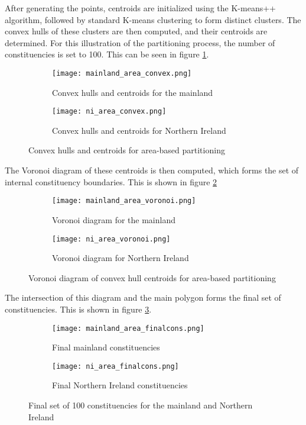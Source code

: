 \documentclass{article}
\begin{document}
After generating the points, centroids are initialized using the K-means++ algorithm, followed by standard K-means clustering to form distinct clusters.
The convex hulls of these clusters are then computed, and their centroids are determined. For this illustration of the partitioning process, the number of constituencies
is set to 100. This can be seen in figure \ref{fig:convexhulls}.

\begin{figure}[H]
    \centering
    \begin{subfigure}{0.48\textwidth}
        \centering
        \texttt{[image: mainland\_area\_convex.png]}
        \caption{Convex hulls and centroids for the mainland}
    \end{subfigure}
    \begin{subfigure}{0.48\textwidth}
        \centering
        \texttt{[image: ni\_area\_convex.png]}
        \caption{Convex hulls and centroids for Northern Ireland}
    \end{subfigure}
    \caption{Convex hulls and centroids for area-based partitioning}
    \label{fig:convexhulls}
\end{figure}


The Voronoi diagram of these centroids is then computed, which forms the set of internal constituency boundaries. This is shown in figure \ref{fig:voronoi}

\begin{figure}[H]
    \centering
    \begin{subfigure}{0.48\textwidth}
        \centering
        \texttt{[image: mainland\_area\_voronoi.png]}
        \caption{Voronoi diagram for the mainland}
    \end{subfigure}
    \begin{subfigure}{0.48\textwidth}
        \centering
        \texttt{[image: ni\_area\_voronoi.png]}
        \caption{Voronoi diagram for Northern Ireland}
    \end{subfigure}
    \caption{Voronoi diagram of convex hull centroids for area-based partitioning}
    \label{fig:voronoi}
\end{figure}

The intersection of this diagram and the main polygon forms the final set of constituencies. This is shown in figure \ref{fig:finalcons}.

\begin{figure}[H]
    \centering
    \begin{subfigure}{0.48\textwidth}
        \centering
        \texttt{[image: mainland\_area\_finalcons.png]}
        \caption{Final mainland constituencies}
    \end{subfigure}
    \begin{subfigure}{0.48\textwidth}
        \centering
        \texttt{[image: ni\_area\_finalcons.png]}
        \caption{Final Northern Ireland constituencies}
    \end{subfigure}
    \caption{Final set of 100 constituencies for the mainland and Northern Ireland}
    \label{fig:finalcons}
\end{figure}
\end{document}
